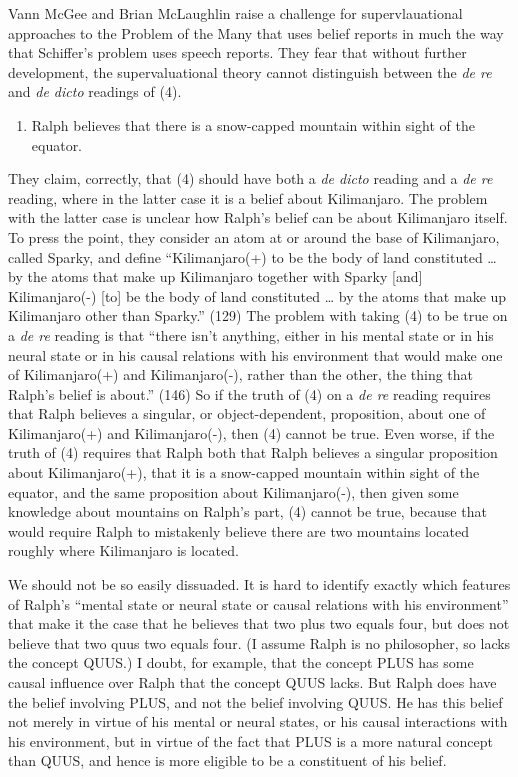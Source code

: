 Vann McGee and Brian McLaughlin \citeyearpar{McGee2000} raise a challenge for supervlauational app\-roach\-es to the Problem of the Many that uses belief reports in much the way that Schiffer's problem uses speech reports. They fear that without further development, the supervaluational theory cannot distinguish between the \textit{de re }and \textit{de dicto} readings of (4).

\begin{enumerate}
\renewcommand{\labelenumi}{(\arabic{enumi})}
\setcounter{enumi}{3}
\item Ralph believes that there is a snow-capped mountain within sight of the equator.
\end{enumerate}

\noindent They claim, correctly, that (4) should have both a \textit{de dicto} reading and a \textit{de re} reading, where in the latter case it is a belief about Kilimanjaro. The problem with the latter case is unclear how Ralph's belief can be about Kilimanjaro itself. To press the point, they consider an atom at or around the base of Kilimanjaro, called Sparky, and define ``Kilimanjaro(+) to be the body of land constituted {\dots} by the atoms that make up Kilimanjaro together with Sparky [and] Kilimanjaro(-) [to] be the body of land constituted {\dots} by the atoms that make up Kilimanjaro other than Sparky.'' (129) The problem with taking (4) to be true on a \textit{de re} reading is that ``there isn't anything, either in his mental state or in his neural state or in his causal relations with his environment that would make one of Kilimanjaro(+) and Kilimanjaro(-), rather than the other, the thing that Ralph's belief is about.'' (146) So if the truth of (4) on a \textit{de re} reading requires that Ralph believes a singular, or object-dependent, proposition, about one of Kilimanjaro(+) and Kilimanjaro(-), then (4) cannot be true. Even worse, if the truth of (4) requires that Ralph both that Ralph believes a singular proposition about Kilimanjaro(+), that it is a snow-capped mountain within sight of the equator, and the same proposition about Kilimanjaro(-), then given some knowledge about mountains on Ralph's part, (4) cannot be true, because that would require Ralph to mistakenly believe there are two mountains located roughly where Kilimanjaro is located.

We should not be so easily dissuaded. It is hard to identify exactly which features of Ralph's ``mental state or neural state or causal relations with his environment'' that make it the case that he believes that two plus two equals four, but does not believe that two quus two equals four. (I assume Ralph is no philosopher, so lacks the concept QUUS.) I doubt, for example, that the concept PLUS has some causal influence over Ralph that the concept QUUS lacks. But Ralph does have the belief involving PLUS, and not the belief involving QUUS. He has this belief not merely in virtue of his mental or neural states, or his causal interactions with his environment, but in virtue of the fact that PLUS is a more natural concept than QUUS, and hence is more eligible to be a constituent of his belief.

